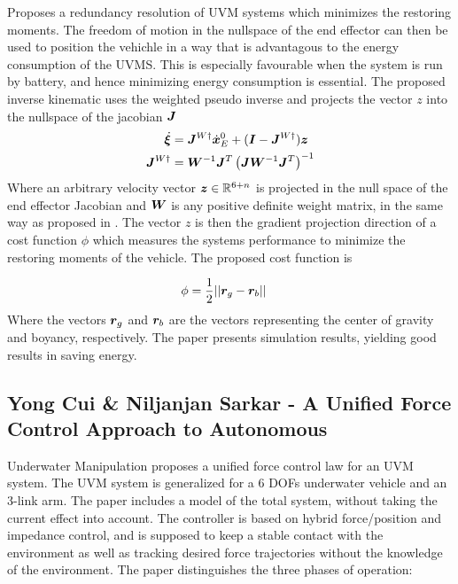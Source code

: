 \cite{redundancy_res_restoring_forces} Proposes a redundancy resolution of UVM systems which minimizes the restoring moments. The freedom of motion in the nullspace of the end effector can then be used to position the vehichle in a way that is advantagous to the energy consumption of the UVMS. This is especially favourable when the system is run by battery, and hence minimizing energy consumption is essential.
The proposed inverse kinematic uses the weighted pseudo inverse and projects the vector $z$ into the nullspace of the jacobian $\boldsymbol J$ 
\begin{align}
  \dot{\boldsymbol \xi}&=\boldsymbol J^{W \dagger} \dot{\boldsymbol x}_E^0+(\boldsymbol I- \boldsymbol J^{W \dagger})\boldsymbol z
  \label{eq:restoringforces_inverse}  \\
  \boldsymbol J^{W \dagger}&= \boldsymbol W^{-1} \boldsymbol J^T  \left( \boldsymbol J \boldsymbol W^{-1} \boldsymbol J^T \right) ^{-1}
  \label{eq:restoring_J}
\end{align}
Where an arbitrary velocity vector $\boldsymbol z\in \mathbb{R}^{6+n}$ is projected in the null space of the end effector Jacobian and $\boldsymbol W$ is any positive definite weight matrix, in the same way as proposed in \cite{antonelli1}. 
The vector $z$ is then the gradient projection direction of a cost function $\phi$ which measures the systems performance to minimize the restoring moments of the vehicle. The proposed cost function is

\begin{align}
	\phi &= \frac{1}{2} || \boldsymbol r_{g} - \boldsymbol r_{b} ||
	\label{eq:minimizingrestoring}
\end{align}
Where the vectors $\boldsymbol r_{g}$ and $\boldsymbol r_{b}$ are the vectors representing the center of gravity and boyancy, respectively. The paper presents simulation results, yielding good results in saving energy.







\subsection{Yong Cui \& Niljanjan Sarkar - A Unified Force Control Approach to Autonomous}
Underwater Manipulation
\cite{unified_force_control} proposes a unified force control law for an UVM system. The UVM system is generalized for a 6 DOFs underwater vehicle and an 3-link arm. The paper includes a model of the total system, without taking the current effect into account. The controller is based on hybrid force/position and impedance control, and is supposed to keep a stable contact with the environment as well as tracking desired force trajectories without the knowledge of the environment. The paper distinguishes the three phases of operation: 


